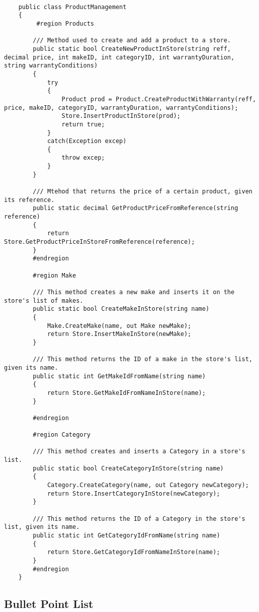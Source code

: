 \documentclass[11pt]{scrartcl} %
\begin{document}
\vspace{15px}
\begin{lstlisting}[language={[Sharp]C}, caption={Classe ProductManagement.cs}, label={Classe ProductManagement.cs}]
	
	public class ProductManagement
	{
		 #region Products
		 
		/// Method used to create and add a product to a store.
		public static bool CreateNewProductInStore(string reff, decimal price, int makeID, int categoryID, int warrantyDuration, string warrantyConditions)
		{
			try
			{
				Product prod = Product.CreateProductWithWarranty(reff, price, makeID, categoryID, warrantyDuration, warrantyConditions);
				Store.InsertProductInStore(prod);
				return true;
			}
			catch(Exception excep)
			{
				throw excep;
			}
		}
		
		/// Mtehod that returns the price of a certain product, given its reference.
		public static decimal GetProductPriceFromReference(string reference)
		{
			return Store.GetProductPriceInStoreFromReference(reference);
		}
		#endregion
		
		#region Make

		/// This method creates a new make and inserts it on the store's list of makes.
		public static bool CreateMakeInStore(string name)
		{
			Make.CreateMake(name, out Make newMake);
			return Store.InsertMakeInStore(newMake);
		}
		
		/// This method returns the ID of a make in the store's list, given its name.
		public static int GetMakeIdFromName(string name)
		{
			return Store.GetMakeIdFromNameInStore(name);
		}
		
		#endregion
		
		#region Category

		/// This method creates and inserts a Category in a store's list.
		public static bool CreateCategoryInStore(string name)
		{
			Category.CreateCategory(name, out Category newCategory);
			return Store.InsertCategoryInStore(newCategory);
		}
		
		/// This method returns the ID of a Category in the store's list, given its name.
		public static int GetCategoryIdFromName(string name)
		{
			return Store.GetCategoryIdFromNameInStore(name);
		}
		#endregion
	}
\end{lstlisting}

\subsection{Bullet Point List}
\end{document}
